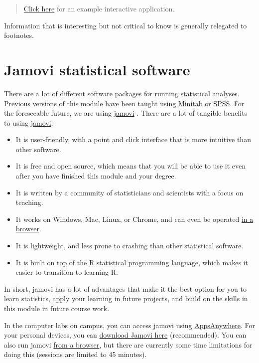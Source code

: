 \documentclass[
]{scrbook}
\providecommand{\tightlist}{%
  \setlength{\itemsep}{0pt}\setlength{\parskip}{0pt}}
\begin{document}
\begin{quote}
\href{https://bradduthie.shinyapps.io/forest/}{Click here} for an example interactive application.
\end{quote}

Information that is interesting but not critical to know is generally relegated to footnotes.

\hypertarget{jamovi}{%
\section*{Jamovi statistical software}\label{jamovi}}

There are a lot of different software packages for running statistical analyses.
Previous versions of this module have been taught using \href{https://www.minitab.com/en-us/}{Minitab} or \href{https://www.ibm.com/uk-en/products/spss-statistics}{SPSS}.
For the foreseeable future, we are using \href{https://www.jamovi.org/}{jamovi} \citep{Jamovi2022}.
There are a lot of tangible benefits to using \href{https://www.jamovi.org/}{jamovi}:

\begin{itemize}
\tightlist
\item
  It is user-friendly, with a point and click interface that is more intuitive than other software.
\item
  It is free and open source, which means that you will be able to use it even after you have finished this module and your degree.
\item
  It is written by a community of statisticians and scientists with a focus on teaching.
\item
  It works on Windows, Mac, Linux, or Chrome, and can even be operated \href{https://www.jamovi.org/cloud.html}{in a browser}.
\item
  It is lightweight, and less prone to crashing than other statistical software.
\item
  It is built on top of the \href{https://www.r-project.org/about.html}{R statistical programming language}, which makes it easier to transition to learning R.
\end{itemize}

In short, jamovi has a lot of advantages that make it the best option for you to learn statistics, apply your learning in future projects, and build on the skills in this module in future course work.

In the computer labs on campus, you can access jamovi using \href{https://appsanywhere.stir.ac.uk/}{AppsAnywhere}.
For your personal devices, you can \href{https://www.jamovi.org/download.html}{download Jamovi here} (recommended).
You can also run jamovi \href{https://www.jamovi.org/cloud.html}{from a browser}, but there are currently some time limitations for doing this (sessions are limited to 45 minutes).
\end{document}
